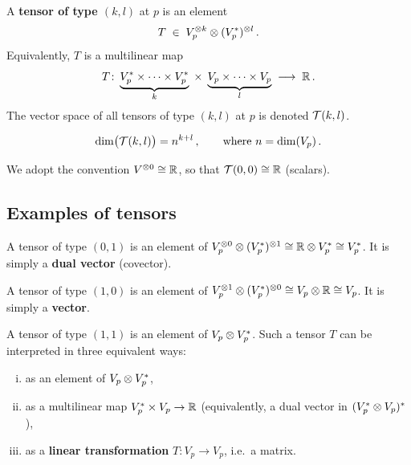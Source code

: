 \begin{definition}\label{def:tensor-type}
  A \textbf{tensor of type $(k,l)$} at $p$ is an element
  \[
    T \;\in\; V_p^{\otimes k}\otimes (V_p^*)^{\otimes l}\,.
  \]
  Equivalently, $T$ is a multilinear map
  \[
    T\colon \underbrace{V_p^*\times\cdots\times V_p^*}_{k}
      \;\times\;
      \underbrace{V_p\times\cdots\times V_p}_{l}
      \;\longrightarrow\; \mathbb{R}\,.
  \]
  The vector space of all tensors of type $(k,l)$ at $p$ is denoted
  $\mathcal{T}(k,l)$.
\end{definition}

\begin{equation}\label{eq:dim-tensor-space}
  \dim\bigl(\mathcal{T}(k,l)\bigr) = n^{k+l}\,,
  \qquad\text{where } n = \dim(V_p)\,.
\end{equation}

\begin{remark}
  We adopt the convention $V^{\otimes 0} \cong \mathbb{R}$, so that
  $\mathcal{T}(0,0) \cong \mathbb{R}$ (scalars).
\end{remark}

\subsection{Examples of tensors}\label{sec:tensor-examples}

\begin{example}\label{ex:type-01}
  A tensor of type $(0,1)$ is an element of
  $V_p^{\otimes 0}\otimes (V_p^*)^{\otimes 1} \cong \mathbb{R}\otimes V_p^* \cong V_p^*$.
  It is simply a \textbf{dual vector} (covector).
\end{example}

\begin{example}\label{ex:type-10}
  A tensor of type $(1,0)$ is an element of
  $V_p^{\otimes 1}\otimes (V_p^*)^{\otimes 0} \cong V_p\otimes \mathbb{R} \cong V_p$.
  It is simply a \textbf{vector}.
\end{example}

\begin{example}\label{ex:type-11}
  A tensor of type $(1,1)$ is an element of $V_p\otimes V_p^*$.
  Such a tensor $T$ can be interpreted in three equivalent ways:
  \begin{enumerate}[(i)]
    \item as an element of $V_p\otimes V_p^*$,
    \item as a multilinear map $V_p^*\times V_p \to \mathbb{R}$
      (equivalently, a dual vector in $(V_p^*\otimes V_p)^*$),
    \item as a \textbf{linear transformation}
      $T\colon V_p\to V_p$, i.e.\ a matrix.
  \end{enumerate}
\end{example}

